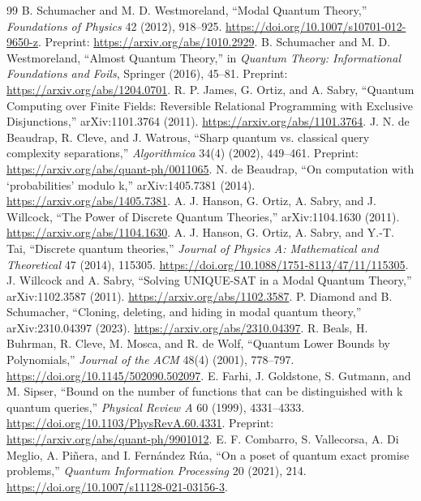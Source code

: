 \documentclass[11pt]{article}
\begin{document}
\begin{thebibliography}{99}
 B. Schumacher and M. D. Westmoreland, ``Modal Quantum Theory,'' \emph{Foundations of Physics} 42 (2012), 918--925. \url{https://doi.org/10.1007/s10701-012-9650-z}. Preprint: \url{https://arxiv.org/abs/1010.2929}.
 B. Schumacher and M. D. Westmoreland, ``Almost Quantum Theory,'' in \emph{Quantum Theory: Informational Foundations and Foils}, Springer (2016), 45--81. Preprint: \url{https://arxiv.org/abs/1204.0701}.
 R. P. James, G. Ortiz, and A. Sabry, ``Quantum Computing over Finite Fields: Reversible Relational Programming with Exclusive Disjunctions,'' arXiv:1101.3764 (2011). \url{https://arxiv.org/abs/1101.3764}.
 J. N. de Beaudrap, R. Cleve, and J. Watrous, ``Sharp quantum vs. classical query complexity separations,'' \emph{Algorithmica} 34(4) (2002), 449--461. Preprint: \url{https://arxiv.org/abs/quant-ph/0011065}.
 N. de Beaudrap, ``On computation with `probabilities' modulo k,'' arXiv:1405.7381 (2014). \url{https://arxiv.org/abs/1405.7381}.
 A. J. Hanson, G. Ortiz, A. Sabry, and J. Willcock, ``The Power of Discrete Quantum Theories,'' arXiv:1104.1630 (2011). \url{https://arxiv.org/abs/1104.1630}.
 A. J. Hanson, G. Ortiz, A. Sabry, and Y.-T. Tai, ``Discrete quantum theories,'' \emph{Journal of Physics A: Mathematical and Theoretical} 47 (2014), 115305. \url{https://doi.org/10.1088/1751-8113/47/11/115305}.
 J. Willcock and A. Sabry, ``Solving UNIQUE-SAT in a Modal Quantum Theory,'' arXiv:1102.3587 (2011). \url{https://arxiv.org/abs/1102.3587}.
 P. Diamond and B. Schumacher, ``Cloning, deleting, and hiding in modal quantum theory,'' arXiv:2310.04397 (2023). \url{https://arxiv.org/abs/2310.04397}.
 R. Beals, H. Buhrman, R. Cleve, M. Mosca, and R. de Wolf, ``Quantum Lower Bounds by Polynomials,'' \emph{Journal of the ACM} 48(4) (2001), 778--797. \url{https://doi.org/10.1145/502090.502097}.
 E. Farhi, J. Goldstone, S. Gutmann, and M. Sipser, ``Bound on the number of functions that can be distinguished with k quantum queries,'' \emph{Physical Review A} 60 (1999), 4331--4333. \url{https://doi.org/10.1103/PhysRevA.60.4331}. Preprint: \url{https://arxiv.org/abs/quant-ph/9901012}.
 E. F. Combarro, S. Vallecorsa, A. Di Meglio, A. Pi\~nera, and I. Fern\'andez R\'ua, ``On a poset of quantum exact promise problems,'' \emph{Quantum Information Processing} 20 (2021), 214. \url{https://doi.org/10.1007/s11128-021-03156-3}.

\end{thebibliography}
\end{document}
